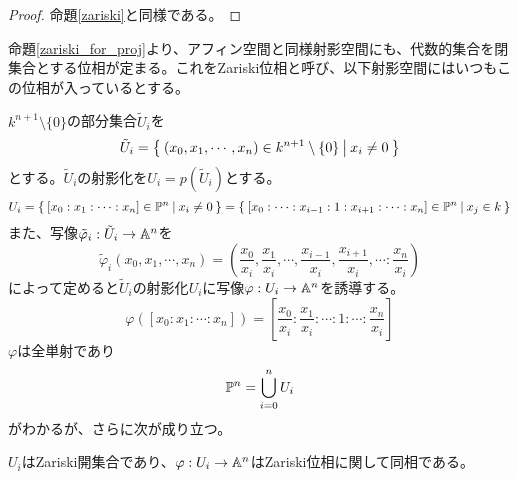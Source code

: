 \documentclass{ltjsreport}
\begin{document}
\begin{proof}
  命題\ref{zariski}と同様である。
\end{proof}

命題\ref{zariski_for_proj}より、アフィン空間と同様射影空間にも、代数的集合を閉集合とする位相が定まる。これをZariski位相と呼び、以下射影空間にはいつもこの位相が入っているとする。

$k^{n+1}\setminus\{0\}$の部分集合$\tilde{U}_i$を
\[
\tilde{U}_i=\left\{\:(x_0,x_1,\cdots,x_n)\in k^{n+1}\setminus\{0\}\:\middle|\:x_i\neq 0\:\right\}  
\]
とする。$\tilde{U}_i$の射影化を$U_i=p(\tilde{U}_i)$とする。
\[
U_i=\left\{\:[x_0:x_1:\cdots:x_n]\in\mathbb{P}^n\:\middle|\:x_i\neq 0\:\right\}=\left\{\:[x_0:\cdots:x_{i-1}:1:x_{i+1}:\cdots:x_n]\in\mathbb{P}^n\:\middle|\:x_j\in k\:\right\} 
\]
また、写像$\tilde{\varphi}_i:\tilde{U}_i\rightarrow \mathbb{A}^n$を
\[
\tilde{\varphi}_i(x_0,x_1,\cdots,x_n)=(\frac{x_0}{x_i},\frac{x_1}{x_i},\cdots,\frac{x_{i-1}}{x_i},\frac{x_{i+1}}{x_i},\cdots:\frac{x_n}{x_i})
\]
によって定めると$\tilde{U}_i$の射影化$U_i$に写像$\varphi:U_i\rightarrow \mathbb{A}^n$を誘導する。
\[
\varphi([x_0:x_1:\cdots:x_n])=[\frac{x_0}{x_i}:\frac{x_1}{x_i}:\cdots:1:\cdots:\frac{x_n}{x_i}] 
\]
$\varphi$は全単射であり
\[
\mathbb{P}^n=\bigcup_{i=0}^nU_i  
\]
がわかるが、さらに次が成り立つ。

\begin{prop}
  $U_i$はZariski開集合であり、$\varphi:U_i\rightarrow \mathbb{A}^n$はZariski位相に関して同相である。
\end{prop}
\end{document}
